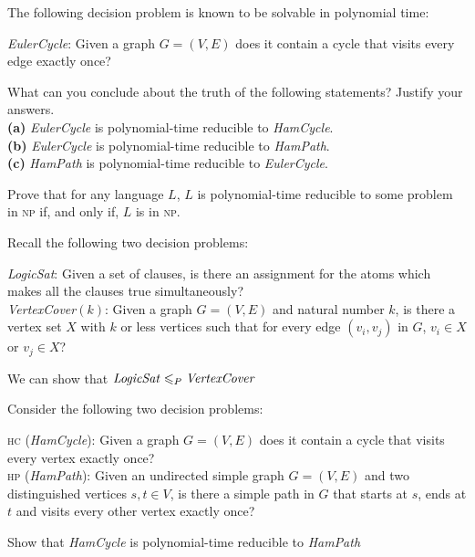 \frmrule

\begin{example}
The following decision problem is known to be solvable in polynomial time:

\textit{EulerCycle}: Given a graph $G = (V, E)$ does it contain a cycle that visits
every edge exactly once?

What can you conclude about the truth of the following statements? Justify
your answers.\\
\textbf{(a)} \textit{EulerCycle} is polynomial-time reducible to \textit{HamCycle}.\\
\textbf{(b)} \textit{EulerCycle} is polynomial-time reducible to \textit{HamPath}.\\
\textbf{(c)} \textit{HamPath} is polynomial-time reducible to \textit{EulerCycle}.
\end{example}

\frmrule


\begin{example}
Prove that for any language $L$, $L$ is polynomial-time reducible to some problem
in \textsc{np} if, and only if, $L$ is in \textsc{np}.
\end{example}


\frmrule




\begin{example}
Recall the following two decision problems:

\textit{LogicSat}: Given a set of clauses, is there an 
assignment for the atoms which makes all the clauses true simultaneously? \\
\textit{VertexCover}$(k)$: Given a graph $G = (V,E)$ and natural number $k$, 
is there a vertex set $X$ with $k$ or less vertices such that for 
every edge $(v_i, v_j)$ in $G$, $v_i \in X$ or $v_j \in X$?


We can show that $\text{\textit{LogicSat}} \leqslant_P \text{\textit{VertexCover}}$


\end{example}


\begin{example}
Consider the following two decision problems:

\textsc{hc} (\textit{HamCycle}): Given a graph $G = (V,E)$ does it contain a cycle that visits
every vertex exactly once? \\
\textsc{hp} (\textit{HamPath}): Given an undirected simple graph $G = (V,E)$ 
and two distinguished vertices $s, t \in V$, 
is there a simple path in $G$ that starts at $s$, ends at $t$ 
and visits every other vertex exactly once?

Show that \textit{HamCycle} is polynomial-time reducible to \textit{HamPath}
\end{example}



